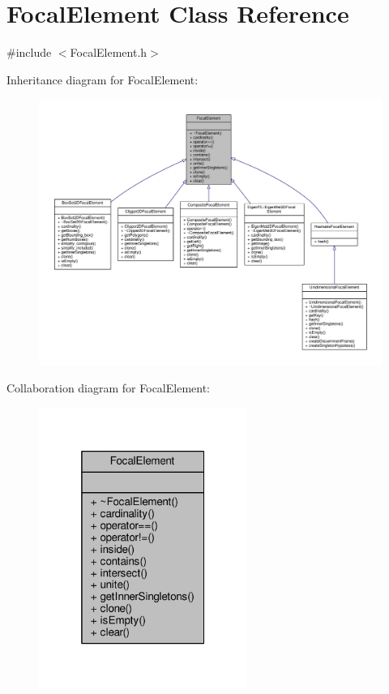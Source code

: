 \hypertarget{classFocalElement}{}\section{Focal\+Element Class Reference}
\label{classFocalElement}


{\ttfamily \#include $<$Focal\+Element.\+h$>$}



Inheritance diagram for Focal\+Element\+:
\nopagebreak
\begin{figure}[H]
\begin{center}
\leavevmode
\includegraphics[width=350pt]{classFocalElement__inherit__graph}
\end{center}
\end{figure}


Collaboration diagram for Focal\+Element\+:\nopagebreak
\begin{figure}[H]
\begin{center}
\leavevmode
\includegraphics[width=193pt]{classFocalElement__coll__graph}
\end{center}
\end{figure}
